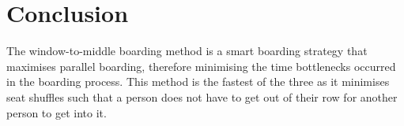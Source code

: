 \documentclass[12pt]{article}
\begin{document}
\newpage

\section{Conclusion}

The window-to-middle boarding method is a smart boarding strategy that
maximises parallel boarding, therefore minimising the time bottlenecks occurred in
the boarding process. This method is the fastest of the three as it minimises
seat shuffles such that a person does not have to get out of their row for
another person to get into it.
\end{document}
